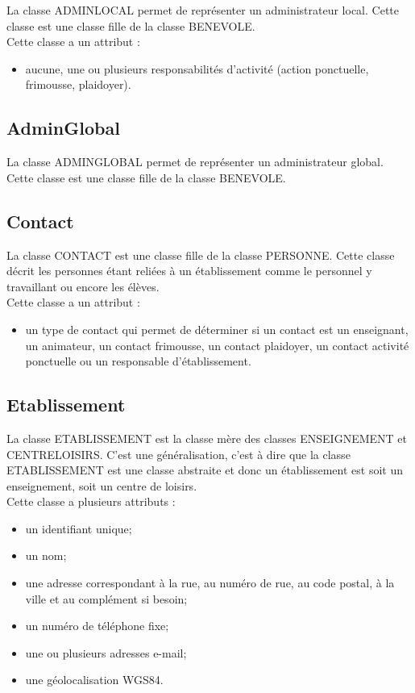 \documentclass[asi, sansVersion]{picInsa}
\begin{document}
La classe ADMINLOCAL permet de représenter un administrateur local. Cette classe est une classe fille de la classe BENEVOLE.\\
Cette classe a un attribut :
\begin{itemize}
\item aucune, une ou plusieurs responsabilités d'activité (action ponctuelle, frimousse, plaidoyer). 
\end{itemize}

\subsection*{AdminGlobal}

La classe ADMINGLOBAL permet de représenter un administrateur global. Cette classe est une classe fille de la classe BENEVOLE. 

\subsection*{Contact}

La classe CONTACT est une classe fille de la classe PERSONNE. Cette classe décrit les personnes étant reliées à un établissement comme le personnel y travaillant ou encore les élèves. \\
Cette classe a un attribut : 
\begin{itemize}
\item un type de contact qui permet de déterminer si un contact est un enseignant, un animateur, un contact frimousse, un contact plaidoyer, un contact activité ponctuelle ou un responsable d'établissement.
\end{itemize} 


\subsection*{Etablissement}

La classe ETABLISSEMENT est la classe mère des classes ENSEIGNEMENT et CENTRELOISIRS. C'est une généralisation, c'est à dire que la classe ETABLISSEMENT est une classe abstraite et donc un établissement est soit un enseignement, soit un centre de loisirs. \\
Cette classe a plusieurs attributs : 
\begin{itemize}
\item un identifiant unique;
\item un nom;
\item une adresse correspondant à la rue, au numéro de rue, au code postal, à la ville et au complément si besoin; %
\item un numéro de téléphone fixe;
\item une ou plusieurs adresses e-mail; %
\item une géolocalisation WGS84. %
\end{itemize}
\end{document}
